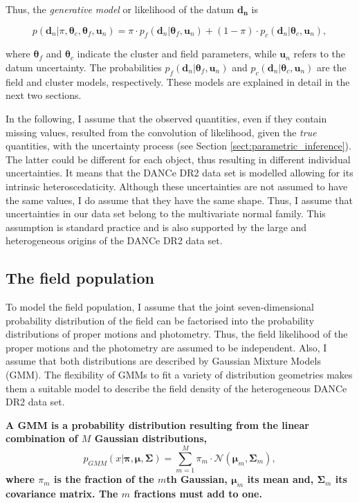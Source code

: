 Thus, the \emph{generative model} or likelihood of the datum $\mathbf{d_n}$  is

\begin{equation}
\label{eq:genmod}
p(\mathbf{d}_n | \pi,\boldsymbol{\theta}_c,\boldsymbol{\theta}_f,\mathbf{u}_n)=\pi \cdot p_f(\mathbf{d}_n|\boldsymbol{\theta}_f,\mathbf{u}_n) + (1-\pi)\cdot p_c(\mathbf{d}_n| \boldsymbol{\theta}_c,\mathbf{u}_n),
\end{equation}

where $\boldsymbol{\theta}_f$ and $\boldsymbol{\theta}_c$ indicate the cluster and field parameters, while $\mathbf{u}_n$ refers to the datum uncertainty. The probabilities $p_f(\mathbf{d}_n|\boldsymbol{\theta}_f,\mathbf{u}_n)$ and $p_c(\mathbf{d}_n| \boldsymbol{\theta}_c,\mathbf{u}_n)$ are the field and cluster models, respectively. These models are explained in detail in the next two sections.

In the following, I assume that the observed quantities, even if they contain missing values, resulted from the convolution of likelihood, given the \emph{true} quantities, with the uncertainty process (see Section \ref{sect:parametric_inference}). The latter could be different for each object, thus resulting in different individual uncertainties. It means that the DANCe DR2 data set is modelled allowing for its intrinsic heteroscedaticity. Although these uncertainties are not assumed to have the same values, I do assume that they have the same shape. Thus, I assume that uncertainties in our data set belong to the multivariate normal family.  This assumption is standard practice and is also supported by the large and heterogeneous origins of the DANCe DR2 data set. 

\subsection{The field population}
To model the field population, I assume that the joint seven-dimensional probability distribution of the field can be factorised into the probability distributions of proper motions and photometry. Thus, the field likelihood of the proper motions and the photometry are assumed to be independent. Also, I assume that both distributions are described by Gaussian Mixture Models (GMM). The flexibility of GMMs to fit a variety of distribution geometries makes them a suitable model to describe the field density of the heterogeneous DANCe DR2 data set. 

\textbf{A GMM is a probability distribution resulting from the linear combination of $M$ Gaussian distributions, }
\begin{equation}
p_{GMM}(x|\boldsymbol{\pi},\boldsymbol{\mu},\boldsymbol{\Sigma})=\sum_{m=1}^M \pi_m \cdot \mathcal{N}(\boldsymbol{\mu}_m,\boldsymbol{\Sigma}_m),
\end{equation}
\textbf{where $\pi_m$ is the fraction of the $m$th Gaussian, $\boldsymbol{\mu}_m$ its mean and, $\boldsymbol{\Sigma}_m$ its covariance matrix. The $m$ fractions must add to one. }

